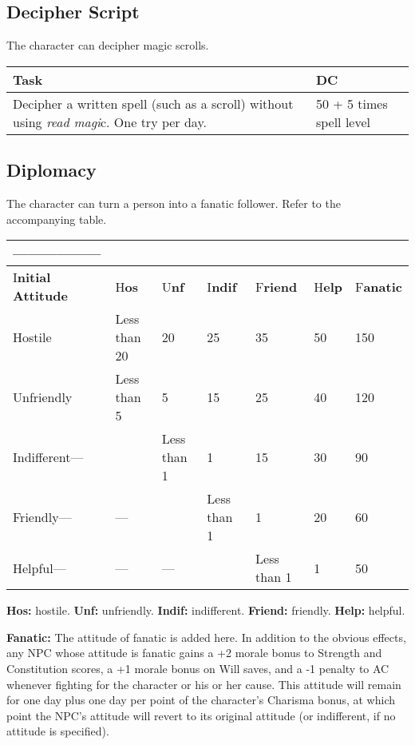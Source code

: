 \documentclass{article}
\begin{document}
\vspace{12pt}
\subsection*{Decipher Script }

The character can decipher magic scrolls. 

\begin{tabular}{|>{\raggedright}p{146pt}|>{\raggedright}p{114pt}|}
\hline
T\textbf{ask} & D\textbf{C }\tabularnewline
\hline
Decipher a written spell (such as a scroll) without using \textit{read magi}c. 
One try per day. & 50 + 5 times spell level \tabularnewline
\hline
\end{tabular}

\vspace{12pt}
\subsection*{Diplomacy }

The character can turn a person into a fanatic follower. Refer to the accompanying 
table.

\begin{tabular}{|>{\raggedright}p{57pt}|>{\raggedright}p{44pt}|>{\raggedright}p{39pt}|>{\raggedright}p{39pt}|>{\raggedright}p{39pt}|>{\raggedright}p{17pt}|>{\raggedright}p{27pt}|}
\hline
------------------ & \multicolumn{6}{p{209pt}|}{N\textbf{ew Attitude ------------------}}\tabularnewline
\hline
I\textbf{nitial Attitude} & H\textbf{os} & U\textbf{nf} & I\textbf{ndif} & F\textbf{riend} & H\textbf{elp} & F\textbf{anatic}\tabularnewline
\hline
Hostile & Less than 20 & 20 & 25 & 35 & 50 & 150\tabularnewline
\hline
Unfriendly & Less than 5 & 5 & 15 & 25 & 40 & 120\tabularnewline
\hline
Indifferent--- &  & Less than 1 & 1 & 15 & 30 & 90\tabularnewline
\hline
Friendly--- & --- &  & Less than 1 & 1 & 20 & 60\tabularnewline
\hline
Helpful--- & --- & --- &  & Less than 1 & 1 & 50\tabularnewline
\hline
\end{tabular}

\textbf{Hos:}\textit{ }hostile. \textbf{Unf:}\textit{ }unfriendly. \textbf{Indif:}\textit{ 
}indifferent. \textbf{Friend:}\textit{ }friendly. \textbf{Help: }helpful. 

\textbf{Fanatic: }The attitude of fanatic is added here. In addition to the obvious 
effects, any NPC whose attitude is fanatic gains a +2 morale bonus to Strength 
and Constitution scores, a +1 morale bonus on Will saves, and a -1 penalty to AC 
whenever fighting for the character or his or her cause. This attitude will remain 
for one day plus one day per point of the character's Charisma bonus, at which 
point the NPC's attitude will revert to its original attitude (or indifferent, 
if no attitude is specified). 
\end{document}
